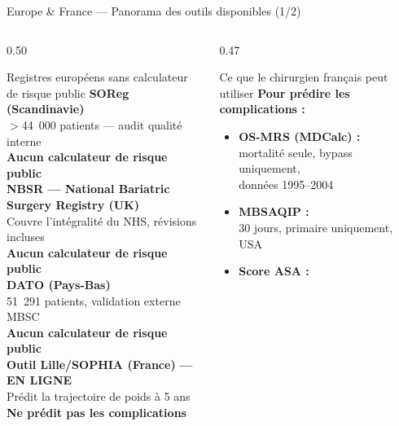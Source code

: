 \documentclass[aspectratio=169]{beamer}
\newcommand{\tightlist}{%
  \setlength{\itemsep}{1pt}\setlength{\parskip}{0pt}%
  \setlength{\parsep}{0pt}\setlength{\topsep}{2pt}}
\begin{document}
\begin{frame}{Europe \& France --- Panorama des outils disponibles (1/2)}
  \begin{columns}[T]
    \begin{column}{0.50\textwidth}
      \begin{block}{Registres européens sans calculateur de risque public}
        \footnotesize
        \textbf{SOReg (Scandinavie)}\\
        $>$44~000 patients --- audit qualité interne\\
        \textcolor{rougealerte}{\textbf{Aucun calculateur de risque public}}\\[6pt]
        \textbf{NBSR --- National Bariatric Surgery Registry (UK)}\\
        Couvre l'intégralité du NHS, révisions incluses\\
        \textcolor{rougealerte}{\textbf{Aucun calculateur de risque public}}\\[6pt]
        \textbf{DATO (Pays-Bas)}\\
        51~291 patients, validation externe MBSC\\
        \textcolor{rougealerte}{\textbf{Aucun calculateur de risque public}}\\[6pt]
        \textbf{Outil Lille/SOPHIA (France)}
        \textcolor{vertdoux}{\textbf{--- EN LIGNE}}\\
        Prédit la trajectoire de poids à 5 ans\\
        \textcolor{rougealerte}{\textbf{Ne prédit pas les complications}}
      \end{block}
    \end{column}
    \begin{column}{0.47\textwidth}
      \begin{alertblock}{Ce que le chirurgien français peut utiliser}
        \footnotesize
        \textbf{Pour prédire les complications :}
        \begin{itemize}\tightlist
          \item \textbf{OS-MRS (MDCalc) :}\\
                mortalité seule, bypass uniquement,\\
                données 1995--2004
          \item \textbf{MBSAQIP :}\\
                30 jours, primaire uniquement, USA
          \item \textbf{Score ASA :}\\

\end{itemize}
\end{alertblock}
\end{column}
\end{columns}
\end{frame}
\end{document}
